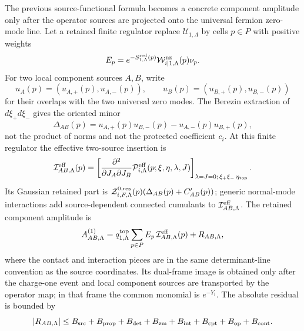 \begin{controlledapproximation}
\label{ca:glsm-one-vortex-component-amplitude-cell}
The previous source-functional formula becomes a concrete component amplitude
only after the operator sources are projected onto the universal fermion
zero-mode line.  Let a retained finite regulator replace
\(\mathcal U_{1,\Lambda}\) by cells \(p\in P\) with positive weights
\[
  E_p
  =
  e^{-S^{\rm red}_{1,\Lambda}(p)}
  \mathcal W^{\rm nz}_{i|1,\Lambda}(p)
  \nu_p .
\]
For two local component sources \(A,B\), write
\[
  u_A(p)=(u_{A,+}(p),u_{A,-}(p)),\qquad
  u_B(p)=(u_{B,+}(p),u_{B,-}(p))
\]
for their overlaps with the two universal zero modes.  The Berezin extraction
of \(d\xi_+d\xi_-\) gives the oriented minor
\begin{equation}
  \Delta_{AB}(p)
  =
  u_{A,+}(p)u_{B,-}(p)
  -
  u_{A,-}(p)u_{B,+}(p),
  \label{eq:glsm-one-vortex-component-source-minor}
\end{equation}
not the product of norms and not the protected coefficient \(c_i\).  At this
finite regulator the effective two-source insertion is
\begin{equation}
  \mathcal I^{\rm eff}_{AB,\Lambda}(p)
  =
  \left[
    \frac{\partial^2}
      {\partial J_A\partial J_B}
    \mathcal P^{\rm eff}_{i,\Lambda}(p;\xi,\eta,\lambda,J)
  \right]_{\lambda=J=0;\,\xi_+\xi_-\,\eta_{\rm top}} .
  \label{eq:glsm-one-vortex-component-effective-insertion}
\end{equation}
Its Gaussian retained part is
\(\mathcal Z^{0,{\rm res}}_{i,F,\Lambda}(p)
(\Delta_{AB}(p)+C'_{AB}(p))\); generic normal-mode interactions add
source-dependent connected cumulants to
\(\mathcal I^{\rm eff}_{AB,\Lambda}\).  The retained component amplitude is
\begin{equation}
  A^{(1)}_{AB,\Lambda}
  =
  q^{\rm top}_{1,\Lambda}
  \sum_{p\in P}
  E_p\,
  \mathcal I^{\rm eff}_{AB,\Lambda}(p)
  +
  R_{AB,\Lambda},
  \label{eq:glsm-one-vortex-component-cell-amplitude}
\end{equation}
where the contact and interaction pieces are in the same determinant-line
convention as the source coordinates.  Its dual-frame image is obtained only
after the charge-one event and local component sources are transported by the
operator map; in that frame the common monomial is \(e^{-Y_i}\).  The absolute
residual is bounded by
\begin{equation}
  |R_{AB,\Lambda}|
  \le
  B_{\rm src}+B_{\rm prop}+B_{\rm det}+B_{\rm zm}
  +B_{\rm int}+B_{\rm cpt}+B_{\rm op}+B_{\rm cont}.

\end{equation}
\end{controlledapproximation}
